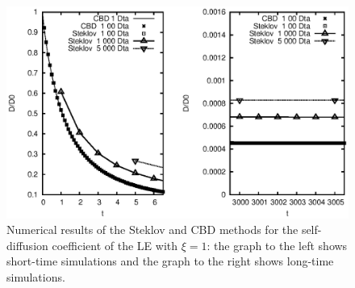 	\begin{figure}[h!]
		\begin{center}
			\includegraphics{./papers/paperA/figures/short-longMSD.eps}
		\end{center}
		\caption{
		Numerical results of the Steklov and CBD methods for the self-diffusion coefficient
		of the LE with $\xi=1$: the graph to the left shows short-time simulations and the
		graph to the right  shows long-time simulations. }\label{fig:PlotXcubicMSD}%
	\end{figure}
